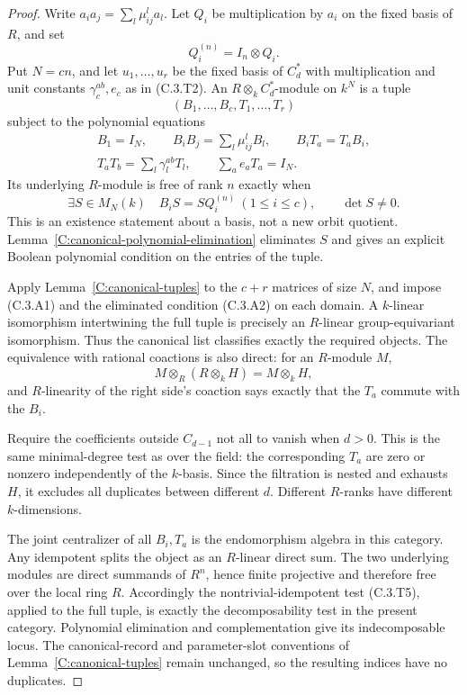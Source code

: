 \begin{proof}
Write $a_i a_j=\sum_l\mu_{ij}^l a_l$. Let $Q_i$ be multiplication by
$a_i$ on the fixed basis of $R$, and set
\[
                       Q_i^{(n)}=I_n\otimes Q_i.
\]
Put $N=cn$, and let $u_1,\ldots,u_r$ be the fixed basis of $C_d^*$ with
multiplication and unit constants $\gamma_c^{ab},e_c$ as in (C.3.T2).
An $R\otimes_k C_d^*$-module on $k^N$ is a tuple
\[
       (B_1,\ldots,B_c,T_1,\ldots,T_r)
\]
subject to the polynomial equations
\[
 \begin{gathered}
 B_1=I_N,\qquad B_iB_j=\sum_l\mu_{ij}^l B_l,
       \qquad B_iT_a=T_aB_i,\\
 T_aT_b=\sum_l\gamma_l^{ab}T_l,
       \qquad \sum_a e_aT_a=I_N .
 \end{gathered}                                           \tag{C.3.A1}
\]
Its underlying $R$-module is free of rank $n$ exactly when
\[
 \exists S\in M_N(k)\quad
     B_iS=SQ_i^{(n)}\ (1\leq i\leq c),\qquad \det S\ne0.
                                                               \tag{C.3.A2}
\]
This is an existence statement about a basis, not a new orbit quotient.
Lemma~\ref{C:canonical-polynomial-elimination} eliminates $S$ and gives
an explicit Boolean polynomial condition on the entries of the tuple.

Apply Lemma~\ref{C:canonical-tuples} to the $c+r$ matrices of size $N$,
and impose (C.3.A1) and the eliminated condition (C.3.A2) on each domain.
A $k$-linear isomorphism intertwining the full tuple is precisely an
$R$-linear group-equivariant isomorphism. Thus the canonical list classifies
exactly the required objects. The equivalence with rational coactions is
also direct: for an $R$-module $M$,
\[
 M\otimes_R(R\otimes_k H)=M\otimes_k H,
\]
and $R$-linearity of the right side's coaction says exactly that the
$T_a$ commute with the $B_i$.

Require the coefficients outside $C_{d-1}$ not all to vanish when $d>0$.
This is the same minimal-degree test as over the field: the corresponding
$T_a$ are zero or nonzero independently of the $k$-basis. Since the
filtration is nested and exhausts $H$, it excludes all duplicates between
different $d$. Different $R$-ranks have different $k$-dimensions.

The joint centralizer of all $B_i,T_a$ is the endomorphism algebra in this
category. Any idempotent splits the object as an $R$-linear direct sum.
The two underlying modules are direct summands of $R^n$, hence finite
projective and therefore free over the local ring $R$. Accordingly the
nontrivial-idempotent test (C.3.T5), applied to the full tuple, is exactly
the decomposability test in the present category. Polynomial elimination
and complementation give its indecomposable locus. The canonical-record
and parameter-slot conventions of Lemma~\ref{C:canonical-tuples} remain
unchanged, so the resulting indices have no duplicates.


\end{proof}

